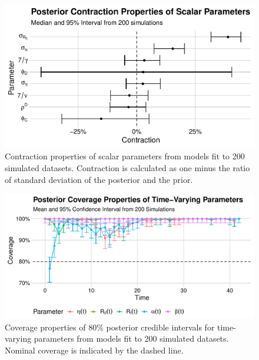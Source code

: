 \begin{figure}[htbp]
    \centering
    \includegraphics[width=1.0\columnwidth]{generated_quantities_simulation_scalar_shrinkage_plot}
    \caption{Contraction properties of scalar parameters from models fit to 200 simulated datasets.
    Contraction is calculated as one minus the ratio of standard deviation of the posterior and the prior.}
    \label{ch_4:fig:generated_quantities_simulation_scalar_shrinkage_plot}
\end{figure}

\begin{figure}[htbp]
    \centering
    \includegraphics[width=1.0\columnwidth]{generated_quantities_simulation_time_varying_coverage_plot}
    \caption{Coverage properties of 80\% posterior credible intervals for time-varying parameters from models fit to 200 simulated datasets.
    Nominal coverage is indicated by the dashed line.}
    \label{ch_4:fig:generated_quantities_simulation_time_varying_coverage_plot}
\end{figure}

